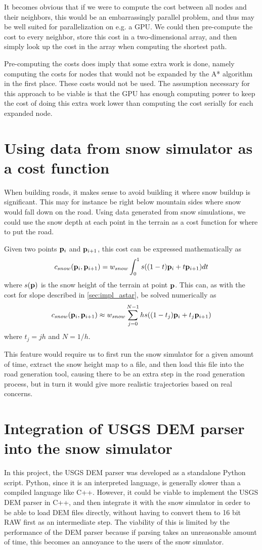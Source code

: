 It becomes obvious that if we were to compute the cost between all nodes and their neighbors, this would be an embarrassingly parallel problem, and thus may be well suited for parallelization on e.g. a GPU. We could then pre-compute the cost to every neighbor, store this cost in a two-dimensional array, and then simply look up the cost in the array when computing the shortest path. 

Pre-computing the costs does imply that some extra work is done, namely computing the costs for nodes that would not be expanded by the A* algorithm in the first place. These costs would not be used. The assumption necessary for this approach to be viable is that the GPU has enough computing power to keep the cost of doing this extra work lower than computing the cost serially for each expanded node. 

\section{Using data from snow simulator as a cost function}
When building roads, it makes sense to avoid building it where snow buildup is significant. This may for instance be right below mountain sides where snow would fall down on the road. Using data generated from snow simulations, we could use the snow depth at each point in the terrain as a cost function for where to put the road. 

Given two points ${\mathbf p}_i$ and ${\mathbf p}_{i+1}$, this cost can be expressed mathematically as
$$
c_{snow}({\mathbf p}_i, {\mathbf p}_{i+1}) = w_{snow}\int_{0}^{1} s((1-t){\mathbf p}_i+t{\mathbf p}_{i+1}) dt
$$
where $s({\mathbf p})$ is the snow height of the terrain at point ${\mathbf p}$. This can, as with the cost for slope described in \ref{sec:impl_astar}, be solved numerically as
$$
c_{snow}({\mathbf p}_i, {\mathbf p}_{i+1}) \approx w_{snow}\sum_{j=0}^{N-1} hs((1-t_j){\mathbf p}_i+t_j{\mathbf p}_{i+1}) 
$$
where $t_j=jh$ and $N=1/h$.

This feature would require us to first run the snow simulator for a given amount of time, extract the snow height map to a file, and then load this file into the road generation tool, causing there to be an extra step in the road generation process, but in turn it would give more realistic trajectories based on real concerns.


\section{Integration of USGS DEM parser into the snow simulator}
\label{sec:future_usgsdem}
In this project, the USGS DEM parser was developed as a standalone Python script. Python, since it is an interpreted language, is generally slower than a compiled language like C++. However, it could be viable to implement the USGS DEM parser in C++, and then integrate it with the snow simulator in order to be able to load DEM files directly, without having to convert them to 16 bit RAW first as an intermediate step. The viability of this is limited by the performance of the DEM parser because if parsing takes an unreasonable amount of time, this becomes an annoyance to the users of the snow simulator.

